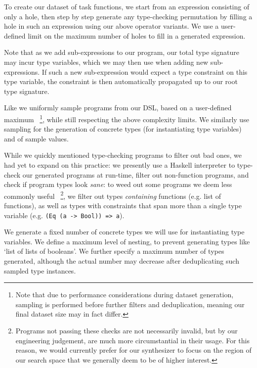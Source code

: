 \documentclass{article}
\begin{document}

To create our dataset of task functions,
we start from an expression consisting of only a hole,
then step by step generate any type-checking permutation
by filling a hole in such an expression using our above operator variants.
We use a 
user-defined
limit on
the maximum number of holes to fill in a generated expression.

Note that as we add sub-expressions to our program,
our total type signature may incur type variables,
which we may then use when adding new sub-expressions.
If such a new sub-expression would expect a type constraint on this type variable,
the constraint is then automatically propagated up to our root type signature.

Like \citet{nsps} we uniformly sample programs from our DSL,
based on a 
user-defined maximum%
~\footnote{
    Note that due to performance considerations during dataset generation,
    sampling is performed before further filters and deduplication,
    meaning our final dataset size may in fact differ.
},
while still respecting the above complexity limits.
We similarly use sampling for the generation of
concrete types (for instantiating type variables) and of sample values.

While we quickly mentioned type-checking programs to filter out bad ones,
we had yet to expand on this practice:
we presently use a Haskell interpreter to type-check our generated programs at run-time,
filter out non-function programs,
and check if program types look \emph{sane}:
to weed out some programs we deem less commonly useful%
~\footnote{
    Programs not passing these checks are not necessarily invalid,
    but by our engineering judgement,
    are much more circumstantial in their usage.
    For this reason, we would currently prefer for our synthesizer to focus on
    the region of our search space that we generally deem to be of higher interest.
},
we filter out types \emph{containing} functions (e.g. list of functions),
as well as types with constraints that span more than a single type variable (e.g. \verb|(Eq (a -> Bool)) => a|).

We generate a fixed number of concrete types we will use for instantiating type variables.
We define a
maximum level of nesting,
to prevent generating types like `list of lists of booleans'.
We further specify a maximum number of types generated,
although the actual number may decrease after deduplicating such sampled type instances.
\end{document}
